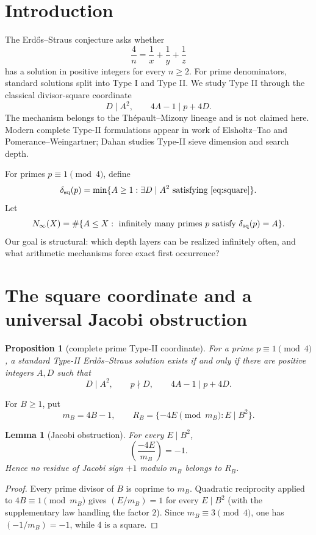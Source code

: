 \documentclass[11pt]{article}
\newtheorem{lemma}[theorem]{Lemma}
\newtheorem{proposition}[theorem]{Proposition}
\theoremstyle{definition}
\newcommand{\sqdepth}{\delta_{\rm sq}}
\begin{document}
\section{Introduction}
The Erd\H{o}s--Straus conjecture asks whether
\[
\frac4n=\frac1x+\frac1y+\frac1z
\]
has a solution in positive integers for every $n\ge2$. For prime denominators, standard solutions split into Type I and Type II. We study Type II through the classical divisor-square coordinate
\begin{equation}\label{eq:square}
D\mid A^2,\qquad 4A-1\mid p+4D.
\end{equation}
The mechanism belongs to the Th\'epault--Mizony lineage and is not claimed here. Modern complete Type-II formulations appear in work of Elsholtz--Tao and Pomerance--Weingartner; Dahan studies Type-II sieve dimension and search depth.

For primes $p\equiv1\pmod4$, define
\[
\sqdepth(p)=\min\{A\ge1:\exists D\mid A^2\text{ satisfying \eqref{eq:square}}\}.
\]
Let
\[
N_\infty(X)=\#\{A\le X:\text{ infinitely many primes }p\text{ satisfy }\sqdepth(p)=A\}.
\]
Our goal is structural: which depth layers can be realized infinitely often, and what arithmetic mechanisms force exact first occurrence?

\section{The square coordinate and a universal Jacobi obstruction}
\begin{proposition}[complete prime Type-II coordinate]\label{prop:complete}
For a prime $p\equiv1\pmod4$, a standard Type-II Erd\H{o}s--Straus solution exists if and only if there are positive integers $A,D$ such that
\[
D\mid A^2,\qquad p\nmid D,\qquad 4A-1\mid p+4D.
\]
\end{proposition}

For $B\ge1$, put
\[
m_B=4B-1,
\qquad
R_B=\{-4E\pmod{m_B}:E\mid B^2\}.
\]

\begin{lemma}[Jacobi obstruction]\label{lem:jacobi}
For every $E\mid B^2$,
\[
\boxed{\left(\frac{-4E}{m_B}\right)=-1.}
\]
Hence no residue of Jacobi sign $+1$ modulo $m_B$ belongs to $R_B$.
\end{lemma}

\begin{proof}
Every prime divisor of $B$ is coprime to $m_B$. Quadratic reciprocity applied to $4B\equiv1\pmod{m_B}$ gives $(E/m_B)=1$ for every $E\mid B^2$ (with the supplementary law handling the factor $2$). Since $m_B\equiv3\pmod4$, one has $(-1/m_B)=-1$, while $4$ is a square.
\end{proof}
\end{document}
